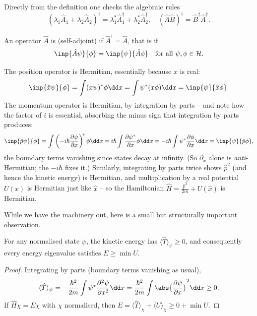 Directly from the definition one checks the algebraic rules
$$
(\lambda_1 \hat{A}_1 + \lambda_2 \hat{A}_2)^\dagger = \lambda_1^* \hat{A}_1^\dagger + \lambda_2^* \hat{A}_2^\dagger, \quad (\hat{A}\hat{B})^\dagger = \hat{B}^\dagger \hat{A}^\dagger.
$$

\begin{definition}
    An operator $\hat{A}$ is  (self-adjoint) if $\hat{A}^\dagger = \hat{A}$, that is if
    $$
    \inp{\hat{A} \psi}{\phi} = \inp{\psi}{\hat{A} \phi} \quad \text{for all } \psi, \phi \in \mathcal{H}.
    $$
\end{definition}

\begin{example}
    The position operator is Hermitian, essentially because $x$ is real:
    $$
    \inp{\hat{x}\psi}{\phi} = \int (x \psi)^* \phi \dd x = \int \psi^* (x \phi) \dd x = \inp{\psi}{\hat{x} \phi}.
    $$
    The momentum operator is Hermitian, by integration by parts -- and note how the factor of $i$ is essential, absorbing the minus sign that integration by parts produces:
    $$
    \inp{\hat{p}\psi}{\phi} = \int \left(-i\hbar \frac{\partial \psi}{\partial x}\right)^{\!*} \phi \dd x = i \hbar \int \frac{\partial \psi^*}{\partial x} \phi \dd x = -i\hbar\int \psi^* \frac{\partial \phi}{\partial x} \dd x = \inp{\psi}{\hat{p}\phi},
    $$
    the boundary terms vanishing since states decay at infinity. (So $\partial_x$ alone is \emph{anti}-Hermitian; the $-i\hbar$ fixes it.) Similarly, integrating by parts twice shows $\hat{p}^2$ (and hence the kinetic energy) is Hermitian, and multiplication by a real potential $U(x)$ is Hermitian just like $\hat{x}$ -- so the Hamiltonian $\hat{H} = \frac{\hat{p}^2}{2m} + U(\hat{x})$ is Hermitian.
\end{example}

While we have the machinery out, here is a small but structurally important observation.

\begin{proposition}
    For any normalised state $\psi$, the kinetic energy has $\langle \hat{T} \rangle_\psi \geq 0$, and consequently every energy eigenvalue satisfies $E \geq \min U$.
\end{proposition}
\begin{proof}
    Integrating by parts (boundary terms vanishing as usual),
    $$
    \langle \hat{T} \rangle_\psi = -\frac{\hbar^2}{2m}\int \psi^* \frac{\partial^2 \psi}{\partial x^2} \dd x = \frac{\hbar^2}{2m} \int \abs{\frac{\partial \psi}{\partial x}}^2 \dd x \geq 0.
    $$
    If $\hat{H}\chi = E \chi$ with $\chi$ normalised, then $E = \langle \hat T \rangle_\chi + \langle U \rangle_\chi \geq 0 + \min U$.
\end{proof}

